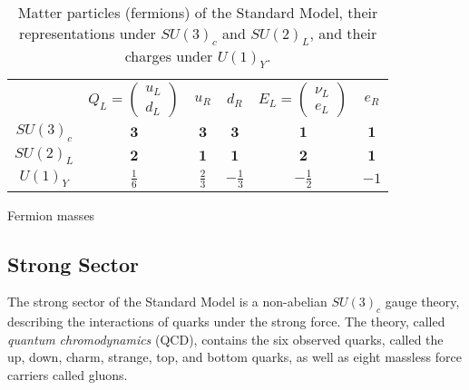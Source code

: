 \begin{table}
	\centering
	\begin{tabular}{cccccc}
		 & $Q_L=\left(\begin{array}{c} u_L \\ d_L \end{array}\right)$ & $u_R$ & $d_R$ & $E_L=\left(\begin{array}{c} \nu_L \\ e_L \end{array}\right) $ & $e_R$ \\
		$SU(3)_c$ & $\mathbf{3}$ &  $\mathbf{3}$ & $\mathbf{3}$ & $\mathbf{1}$ & $\mathbf{1}$ \\
		$SU(2)_L$ & $\mathbf{2}$ & $\mathbf{1}$ & $\mathbf{1}$ & $\mathbf{2}$ & $\mathbf{1}$ \\
		$U(1)_Y$ & $\frac16$ & $\frac23$ & $-\frac13$ & $-\frac12$ & $-1$ \\
	\end{tabular}
	\caption{Matter particles (fermions) of the Standard Model, their representations under $SU(3)_c$ and $SU(2)_L$, and their charges under $U(1)_Y$.}
	\label{table:standard-model-particles}
\end{table}

\begin{table}
	Fermion masses
\end{table}


\subsection{Strong Sector}




The strong sector of the Standard Model is a non-abelian $SU(3)_c$ gauge theory, describing the interactions of quarks under the strong force. The theory, called \emph{quantum chromodynamics} (QCD), contains the six observed quarks, called the up, down, charm, strange, top, and bottom quarks, as well as eight massless force carriers called gluons. 

